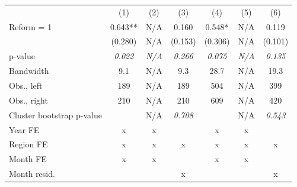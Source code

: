 \begin{tabular}{lcccccc}
 & (1) & (2) & (3) & (4) & (5) & (6) \\
Reform = 1 & 0.643** & N/A & 0.160 & 0.548* & N/A & 0.119 \\
 & (0.280) & N/A & (0.153) & (0.306) & N/A & (0.101) \\
p-value & \textit{0.022} & \textit{N/A} & \textit{0.266} & \textit{0.075} & \textit{N/A} & \textit{0.135} \\
Bandwidth & 9.1 & N/A & 9.3 & 28.7 & N/A & 19.3 \\
Obs., left & 189 & N/A & 189 & 504 & N/A & 399 \\
Obs., right & 210 & N/A & 210 & 609 & N/A & 420 \\
Cluster bootstrap p-value &  & N/A & \textit{0.708} &  & N/A & \textit{0.543} \\
Year FE & x & x &  & x & x &  \\
Region FE & x & x & x & x & x & x \\
Month FE & x & x &  & x & x &  \\
Month resid. &  &  & x &  &  & x \\
\end{tabular}
